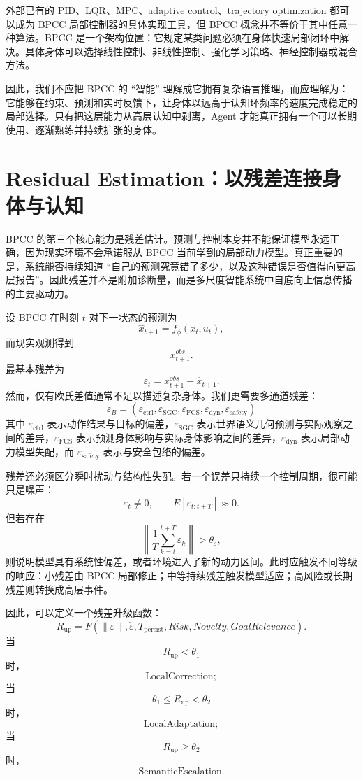 外部已有的 PID、LQR、MPC、adaptive control、trajectory optimization 都可以成为 BPCC 局部控制器的具体实现工具，但 BPCC 概念并不等价于其中任意一种算法。BPCC 是一个架构位置：它规定某类问题必须在身体快速局部闭环中解决。具体身体可以选择线性控制、非线性控制、强化学习策略、神经控制器或混合方法。

因此，我们不应把 BPCC 的 ``智能'' 理解成它拥有复杂语言推理，而应理解为：它能够在约束、预测和实时反馈下，让身体以远高于认知环频率的速度完成稳定的局部选择。只有把这层能力从高层认知中剥离，Agent 才能真正拥有一个可以长期使用、逐渐熟练并持续扩张的身体。

\section{Residual Estimation：以残差连接身体与认知}

BPCC 的第三个核心能力是残差估计。预测与控制本身并不能保证模型永远正确，因为现实环境不会承诺服从 BPCC 当前学到的局部动力模型。真正重要的是，系统能否持续知道 ``自己的预测究竟错了多少，以及这种错误是否值得向更高层报告''。因此残差并不是附加诊断量，而是多尺度智能系统中自底向上信息传播的主要驱动力。

设 BPCC 在时刻 $t$ 对下一状态的预测为
\[
\hat x_{t+1}
=
f_\phi(x_t,u_t),
\]
而现实观测得到
\[
x_{t+1}^{obs}.
\]
最基本残差为
\[
\varepsilon_t
=
x_{t+1}^{obs}
-
\hat x_{t+1}.
\]
然而，仅有欧氏差值通常不足以描述复杂身体。我们更需要多通道残差：
\[
\boxed{
\varepsilon_B
=
(
\varepsilon_{\mathrm{ctrl}},
\varepsilon_{\mathrm{SGC}},
\varepsilon_{\mathrm{FCS}},
\varepsilon_{\mathrm{dyn}},
\varepsilon_{\mathrm{safety}}
)
}
\]
其中 $\varepsilon_{\mathrm{ctrl}}$ 表示动作结果与目标的偏差，$\varepsilon_{\mathrm{SGC}}$ 表示世界语义几何预测与实际观察之间的差异，$\varepsilon_{\mathrm{FCS}}$ 表示预测身体影响与实际身体影响之间的差异，$\varepsilon_{\mathrm{dyn}}$ 表示局部动力模型失配，而 $\varepsilon_{\mathrm{safety}}$ 表示与安全包络的偏差。

残差还必须区分瞬时扰动与结构性失配。若一个误差只持续一个控制周期，很可能只是噪声：
\[
\varepsilon_t\neq0,
\qquad
E[\varepsilon_{t:t+T}]\approx0.
\]
但若存在
\[
\left\|
\frac{1}{T}
\sum_{k=t}^{t+T}
\varepsilon_k
\right\|
>\theta_\varepsilon,
\]
则说明模型具有系统性偏差，或者环境进入了新的动力区间。此时应触发不同等级的响应：小残差由 BPCC 局部修正；中等持续残差触发模型适应；高风险或长期残差则转换成高层事件。

因此，可以定义一个残差升级函数：
\[
R_{\mathrm{up}}
=
F(
\|\varepsilon\|,
\dot{\varepsilon},
T_{\mathrm{persist}},
Risk,
Novelty,
GoalRelevance
).
\]
当
\[
R_{\mathrm{up}}<\theta_1
\]
时，
\[
\text{LocalCorrection};
\]
当
\[
\theta_1\leq R_{\mathrm{up}}<\theta_2
\]
时，
\[
\text{LocalAdaptation};
\]
当
\[
R_{\mathrm{up}}\geq\theta_2
\]
时，
\[
\text{SemanticEscalation}.
\]

